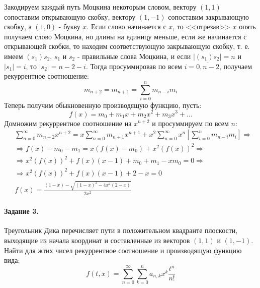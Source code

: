 \documentclass[a4paper,12pt]{article}
\begin{document}
\begin{Solution}
Закодируем каждый путь Моцкина некоторым словом, вектору $\left(1,1\right)$ сопоставим открывающую скобку, вектору $\left(1,-1\right)$ сопоставим закрывающую скобку, а $\left(1, 0\right)$ - букву $x$. Если слово начинается с $x$, то <<отрезав>> $x$ опять получаем слово Моцкина, но длины на единицу меньше, если же начинается с открывающей скобки, то находим соответствующую закрывающую скобку, т. е. имеем $\left(s_1\right)s_2$, $s_1$ и $s_2$ - правильные слова Моцкина, и если $\left|\left(s_1\right)s_2\right| = n$ и $\left|s_1\right| = i$, то $\left|s_2\right| = n-2-i$. Тогда просуммировав по всем $i = \overline{0,n-2}$, получаем рекуррентное соотношение:
\[
	m_{n+2} = m_{n+1} = \sum_{i=0}^n m_{n-i} m_i
\]
Теперь получим обыкновенную производящую функцию, пусть:
\[
	f\left(x\right) = m_0 + m_1 x + m_2 x^2 + m_3 x^3 + ...
\]
Домножим рекуррентное соотношение на $x^{n+2}$ и просуммируем по всем $n$:
\[
	\begin{split}
		& \sum_{n=0}^{\infty}m_{n+2} x^{n+2} = x \sum_{n=0}^{\infty} m_{n+1} x^{n+1} + x^2 \sum_{n=0}^{\infty} x^n \left[\sum_{i=0}^{n} m_{n-i} m_i\right] \Rightarrow \\
		& \Rightarrow f\left(x\right) - m_0 - m_1 = x \left(f\left(x\right) - m_0\right) + x^2 \left(f\left(x\right)\right)^2 \Rightarrow \\
		& \Rightarrow x^2 \left(f\left(x\right)\right)^2 + f\left(x\right)\left(x - 1\right) + m_0 + m_1 - x m_0 = 0\Rightarrow \\
		& \Rightarrow x^2 \left(f\left(x\right)\right)^2 + f\left(x\right)\left(x - 1\right) + 2 - x = 0 \\
		& f\left(x\right) = \frac{\left(1-x\right) - \sqrt{\left(1-x\right)^2 - 4x^2\left(2-x\right)}}{2x^2}
	\end{split}
\]
\end{Solution}

\paragraph{Задание 3.} Треугольник Дика перечисляет пути в положительном квадранте плоскости, выходящие из начала координат и составленные из векторов $(1,1)$ и $(1,-1)$. Найти для жтих чисел рекуррентное соотношение и производящую функцию вида:
\[
	f\left(t,x\right) = \sum_{n=0}^{\infty} \sum_{k=0}^n a_{n,k} x^k \frac{t^n}{n!}
\]
\end{document}
